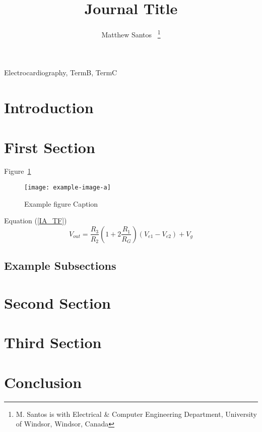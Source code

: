 \documentclass[journal]{templates/IEEEtran}
\begin{document}
\title{Journal Title}

\author{
	Matthew Santos~
	\thanks{M. Santos is with Electrical \& Computer Engineering Department, University of Windsor, Windsor, Canada}
}

\maketitle

\begin{abstract} %
	\lipsum[1]
\end{abstract}

\begin{IEEEkeywords} %
	Electrocardiography, TermB, TermC
\end{IEEEkeywords}

\section{Introduction} 
	\lipsum[2]
\section{First Section}
	\lipsum[3] 
	Figure~\ref{myfig}
	\begin{figure}[!b] %
		\centering
		\texttt{[image: example-image-a]}
		\caption{Example figure Caption}
		\label{myfig}
	\end{figure}
	Equation (\ref{IA_TF})
	\begin{equation}
		V_{out} = \frac{R_3}{R_2}\left(1+2\frac{R_1}{R_G}\right)(V_{e1}-V_{e2})+V_g
		\label{IA_TF}
	\end{equation}
	\newpage %
	\subsection{Example Subsections}
		\lipsum[4]
\section{Second Section}
	\lipsum[5]
\section{Third Section}
	\lipsum[6]
\section{Conclusion} %
	\lipsum[7]

\clearpage
{} %
\nocite{*} %


\end{document}
